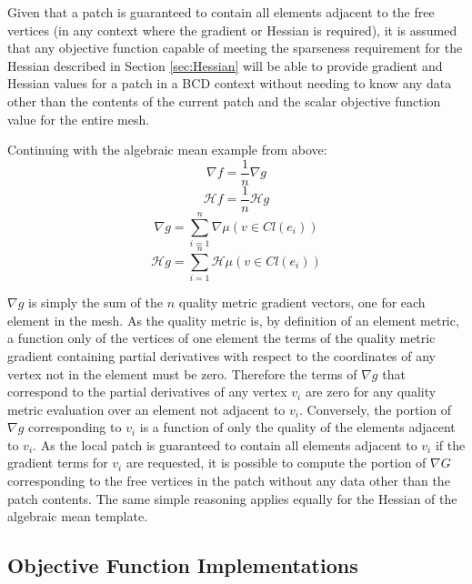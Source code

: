 \documentclass{article}
\begin{document}
Given that a patch is guaranteed to contain all elements adjacent to the free vertices (in any context where the gradient or Hessian is required), it is assumed that any objective function capable of meeting the sparseness requirement for the Hessian described in Section \ref{sec:Hessian} will be able to provide gradient and Hessian values for a patch in a BCD context without needing to know any data other than the contents of the current patch and the scalar objective function value for the entire mesh.

Continuing with the algebraic mean example from above:
\begin{displaymath}
\nabla f = \frac{1}{n} \nabla g
\end{displaymath}
\begin{displaymath}
\mathcal{H} f = \frac{1}{n} \mathcal{H} g
\end{displaymath}
\begin{displaymath}
\nabla g = \sum_{i=1}^{n} \nabla \mu(v \in Cl(e_i))
\end{displaymath}
\begin{displaymath}
\mathcal{H} g = \sum_{i=1}^{n} \mathcal{H} \mu(v \in Cl(e_i))
\end{displaymath}

$\nabla g$ is simply the sum of the $n$ quality metric gradient vectors, one for each element in the mesh.  As the quality metric is, by definition of an element metric, a function only of the vertices of one element the terms of the quality metric gradient containing partial derivatives with respect to the coordinates of any vertex not in the element must be zero.  Therefore the terms of $\nabla g$ that correspond to the partial derivatives of any vertex $v_i$ are zero for any quality metric evaluation over an element not adjacent to $v_i$.  Conversely, the portion of $\nabla g$ corresponding to $v_i$ is a function of only the quality of the elements adjacent to $v_i$.  As the local patch is guaranteed to contain all elements adjacent to $v_i$ if the gradient terms for $v_i$ are requested, it is possible to compute the portion of $\nabla G$ corresponding to the free vertices in the patch without any data other than the patch contents.  The same simple reasoning applies equally for the Hessian of the algebraic mean template.

\subsection{Objective Function Implementations}
\label{sec:objfunc_impl}
\end{document}

